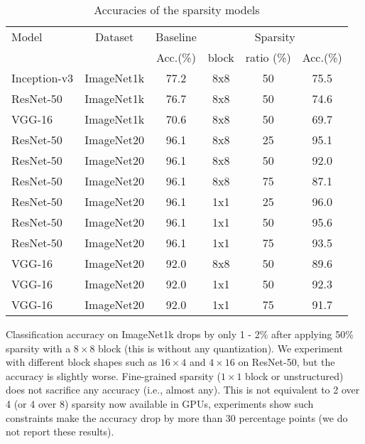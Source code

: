 \documentclass{IEEEtran}
\begin{document}
\begin{table}[ht]
\caption{Accuracies of the sparsity models}
\label{tab_acc}
\begin{center} 
\scalebox{0.9}
{
\begin{tabular}{|l|c|c|c|c|c|}
\hline
\rule[-1ex]{0pt}{3.5ex}  Model & Dataset & Baseline  & \multicolumn{3}{c|}{Sparsity}\\
\rule[-1ex]{0pt}{3.5ex}  {} & {} & Acc.(\%) & block & ratio (\%) & Acc.(\%)    \\\hline\hline
\rule[-1ex]{0pt}{3.5ex}  Inception-v3 & ImageNet1k & 77.2 & 8x8 & 50 & 75.5  \\\hline
\rule[-1ex]{0pt}{3.5ex}  ResNet-50 & ImageNet1k & 76.7 & 8x8 & 50 & 74.6  \\\hline
\rule[-1ex]{0pt}{3.5ex}  VGG-16    & ImageNet1k & 70.6 & 8x8 & 50 & 69.7  \\\hline \hline
\rule[-1ex]{0pt}{3.5ex}  ResNet-50 & ImageNet20 & 96.1 & 8x8 & 25 & 95.1  \\\hline
\rule[-1ex]{0pt}{3.5ex}  ResNet-50 & ImageNet20 & 96.1 & 8x8 & 50 & 92.0  \\\hline
\rule[-1ex]{0pt}{3.5ex}  ResNet-50 & ImageNet20 & 96.1 & 8x8 & 75 & 87.1  \\\hline
\rule[-1ex]{0pt}{3.5ex}  ResNet-50 & ImageNet20 & 96.1 & 1x1 & 25 & 96.0  \\\hline
\rule[-1ex]{0pt}{3.5ex}  ResNet-50 & ImageNet20 & 96.1 & 1x1 & 50 & 95.6  \\\hline
\rule[-1ex]{0pt}{3.5ex}  ResNet-50 & ImageNet20 & 96.1 & 1x1 & 75 & 93.5  \\\hline
\rule[-1ex]{0pt}{3.5ex}  VGG-16    & ImageNet20 & 92.0 & 8x8 & 50 & 89.6  \\\hline
\rule[-1ex]{0pt}{3.5ex}  VGG-16    & ImageNet20 & 92.0 & 1x1 & 50 & 92.3  \\\hline
\rule[-1ex]{0pt}{3.5ex}  VGG-16    & ImageNet20 & 92.0 & 1x1 & 75 & 91.7  \\\hline
\end{tabular}\vspace{-20pt}
}
\end{center}
\end{table}

Classification accuracy on ImageNet1k drops by only 1 - 2\% after
applying 50\% sparsity with a $8\times 8$ block (this is without any
quantization). We experiment with different block shapes such as
$16\times 4$ and $4\times 16$ on ResNet-50, but the accuracy is
slightly worse. Fine-grained sparsity ($1\times 1$ block or
unstructured) does not sacrifice any accuracy (i.e., almost any). This
is not equivalent to 2 over 4 (or 4 over 8) sparsity now available in
GPUs, experiments show such constraints make the accuracy drop by more
than 30 percentage points (we do not report these results).
\end{document}
